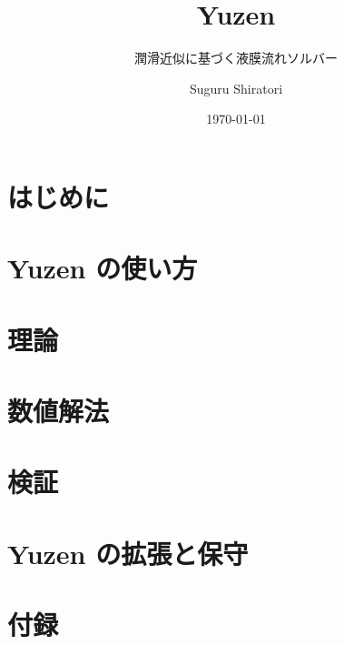 \documentclass[11pt, a4paper, twoside, openright, numbers=noenddot,
               parskip=half-, DIV=12, BCOR=6mm]{scrbook}
\title{Yuzen}
\subtitle{潤滑近似に基づく液膜流れソルバー}
\author{Suguru Shiratori}
\date{\today}
\begin{document}
\frontmatter


\cleardoublepage
{}
\tableofcontents



\mainmatter

\part{はじめに}




\part{Yuzen の使い方}








\part{理論}





\part{数値解法}






\part{検証}



\part{Yuzen の拡張と保守}



\appendix
\part{付録}






\backmatter

\end{document}
